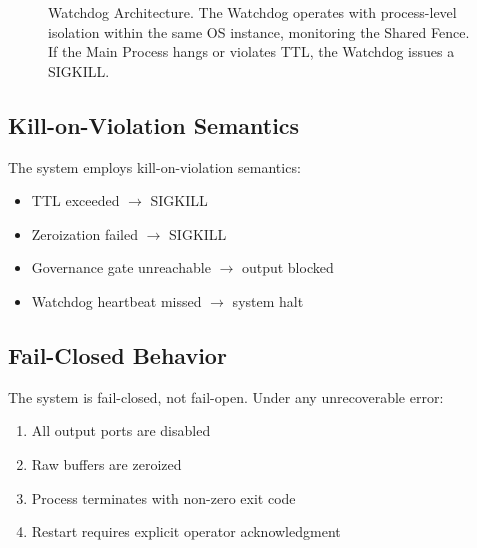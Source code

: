 \documentclass[conference]{IEEEtran}
\begin{document}
\begin{figure}[htbp]
\centering
{}
\caption{Watchdog Architecture. The Watchdog operates with process-level isolation within the same OS instance, monitoring the Shared Fence. If the Main Process hangs or violates TTL, the Watchdog issues a SIGKILL.}
\label{fig:watchdog}
\end{figure}

\subsection{Kill-on-Violation Semantics}
The system employs kill-on-violation semantics:
\begin{itemize}
    \item TTL exceeded $\rightarrow$ SIGKILL
    \item Zeroization failed $\rightarrow$ SIGKILL
    \item Governance gate unreachable $\rightarrow$ output blocked
    \item Watchdog heartbeat missed $\rightarrow$ system halt
\end{itemize}

\subsection{Fail-Closed Behavior}
The system is fail-closed, not fail-open. Under any unrecoverable error:
\begin{enumerate}
    \item All output ports are disabled
    \item Raw buffers are zeroized
    \item Process terminates with non-zero exit code
    \item Restart requires explicit operator acknowledgment
\end{enumerate}
\end{document}
